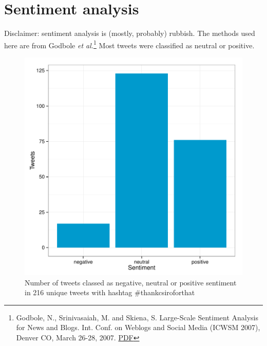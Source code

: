 \documentclass[a4paper,10pt]{article}
\begin{document}
\section{Sentiment analysis}
Disclaimer: sentiment analysis is (mostly, probably) rubbish. The methods used here are from Godbole \textit{et al.}\footnote{Godbole, N., Srinivasaiah, M. and Skiena, S. Large-Scale Sentiment Analysis for News and Blogs. Int. Conf. on Weblogs and Social Media (ICWSM 2007), Denver CO, March 26-28, 2007. \href{http://icwsm.org/papers/3--Godbole-Srinivasaiah-Skiena.pdf}{PDF}} Most tweets were classified as neutral or positive.


\begin{figure}[h]
\begin{center}
\includegraphics[scale=0.55]{thankCSIROjson-senticount.pdf}
\caption{Number of tweets classed as negative, neutral or positive sentiment in 216 unique tweets with hashtag \#thankcsiroforthat}
\end{center}
\end{figure}
\end{document}
